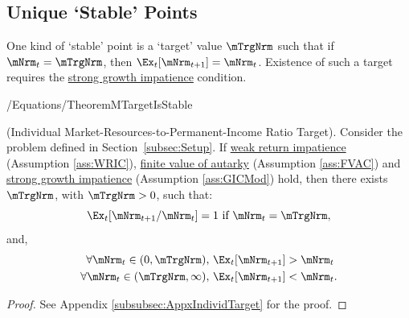 \documentclass[BufferStockTheory]{subfiles}
\begin{document}

\hypertarget{onetarget}{}
\hypertarget{Unique-Stable-Points}{}


\subsection{Unique `Stable' Points}\label{subsec:onetarget}\hypertarget{TheoremTarget}{}

One kind of `stable' point is a `target' value $\mTrgNrm$ such that if $\mNrm_{t}=\mTrgNrm$, then $\Ex_{t}[\mNrm_{t+1}]=\mNrm_{t}$.
Existence of such a target requires the \hyperlink{GICMod}{strong growth impatience} condition.

\begin{verbatimwrite}{\econtexRoot/Equations/TheoremMTargetIsStable}
  \begin{theorem}\label{thm:target} (Individual Market-Resources-to-Permanent-Income Ratio Target).
    Consider the problem defined in Section~\ref{subsec:Setup}.
If \hyperlink{WRIC}{weak return impatience} (Assumption \ref{ass:WRIC}), \hyperlink{FVAC}{finite value of autarky} (Assumption \ref{ass:FVAC}) and \hyperlink{GICMod}{strong growth impatience} (Assumption \ref{ass:GICMod}) hold, then there exists $\mTrgNrm$, with $\mTrgNrm>0$, such that:
    \begin{equation}
      \Ex_t [{\mNrm}_{t+1}/\mNrm_t] = 1 \mbox{~if~} \mNrm_t = \mTrgNrm, 
      \label{eq:mTarget} %
    \end{equation}
    and, 
    \begin{equation}
      \label{eq:stability} %
      \begin{aligned}
        \forall {\mNrm}_t\in(0,\mTrgNrm),      \,\,& \Ex_t [{\mNrm}_{t+1}] > {\mNrm}_t  \\
        \forall {\mNrm}_t\in(\mTrgNrm,\infty), \,\,& \Ex_t [{\mNrm}_{t+1}] < {\mNrm}_t.
      \end{aligned}
    \end{equation}
  \end{theorem}
\end{verbatimwrite} \unskip


\begin{proof}\let\qed\relax
See Appendix \ref{subsubsec:AppxIndividTarget} for the proof.

\end{proof}
\end{document}
